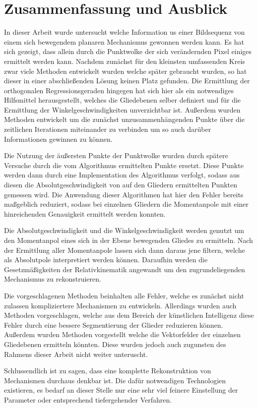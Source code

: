 
\chapter{Zusammenfassung und Ausblick} \label{ch:zusammenfassung_ausblick}

In dieser Arbeit wurde untersucht welche Information us einer Bildsequenz von einem sich bewegendem planaren Mechanismus gewonnen werden kann.
Es hat sich gezeigt, dass allein durch die Punktwolke der sich verändernden Pixel einiges ermittelt werden kann.
Nachdem zunächst für den kleinsten umfassenden Kreis zwar viele Methoden entwickelt wurden welche später gebraucht wurden, so hat dieser in einer abschließenden Lösung keinen Platz gefunden.
Die Ermittlung der orthogonalen Regressionsgeraden hingegen hat sich hier als ein notwendiges Hilfsmittel herausgestellt, welches die Gliedebenen selber definiert und für die Ermittlung der Winkelgeschwindigkeiten unverzichtbar ist.
Außerdem wurden Methoden entwickelt um die zunächst unzusammenhängenden Punkte über die zeitlichen Iterationen miteinander zu verbinden um so auch darüber Informationen gewinnen zu können.

Die Nutzung der äußersten Punkte der Punktwolke wurden durch spätere Versuche durch die vom  Algorithmus ermittelten Punkte ersetzt.
Diese Punkte werden dann durch eine Implementation des  Algorithmus verfolgt, sodass aus diesen die Absolutgeschwindigkeit von auf den Gliedern ermittelten Punkten gemessen wird.
Die Anwendung dieser Algorithmen hat hier den Fehler bereits maßgeblich reduziert, sodass bei einzelnen Gliedern die Momentanpole mit einer hinreichenden Genauigkeit ermittelt werden konnten.

Die Absolutgeschwindigkeit und die Winkelgeschwindigkeit werden genutzt um den Momentanpol eines sich in der Ebene bewegenden Gliedes zu ermitteln.
Nach der Ermittlung aller Momentanpole lassen sich dann daraus jene filtern, welche als Absolutpole interpretiert werden können.
Daraufhin werden die Gesetzmäßigkeiten der Relativkinematik angewandt um den zugrundeliegenden Mechanismus zu rekonstruieren.

Die vorgeschlagenen Methoden beinhalten alle Fehler, welche es zunächst nicht zulassen kompliziertere Mechanismen zu entwickeln.
Allerdings wurden auch Methoden vorgeschlagen, welche aus dem Bereich der künstlichen Intelligenz diese Fehler durch eine bessere Segmentierung der Glieder reduzieren können.
Außerdem wurden Methoden vorgestellt welche die Vektorfelder der einzelnen Gliedebenen ermitteln könnten.
Diese wurden jedoch auch zugunsten des Rahmens dieser Arbeit nicht weiter unteruscht.

Schlussendlich ist zu sagen, dass eine komplette Rekonstruktion von Mechanismen durchaus denkbar ist.
Die dafür notwendigen Technologien existieren, es bedarf an dieser Stelle nur eine sehr viel feinere Einstellung der Parameter oder entsprechend tiefergehender Verfahren.
